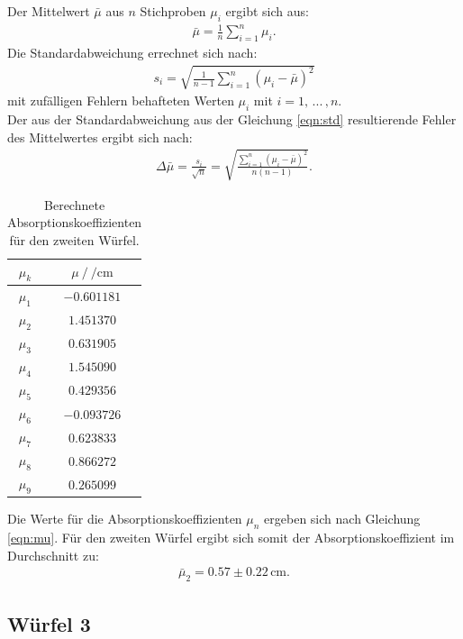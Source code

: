 Der Mittelwert $\bar{\mu}$ aus $n$ Stichproben $\mu_i$ ergibt sich aus: 
\begin{align}
  \bar{\mu} = \frac{1}{n} \sum_{i=1}^n \mu_i.
\end{align}
Die Standardabweichung errechnet sich nach: 
\begin{align}
  \label{eqn:std}
  s_i = \sqrt{\frac{1}{n-1} \sum_{i=1}^n (\mu_i - \bar{\mu})^2}
\end{align}
mit zufälligen Fehlern behafteten Werten $\mu_i$ mit $i =1, \,...\,,n$.\\
Der aus der Standardabweichung aus der Gleichung \ref{eqn:std} resultierende Fehler des Mittelwertes ergibt sich nach: 
\begin{align}
  \Delta \bar{\mu} = \frac{s_i}{\sqrt{n}} = \sqrt{\frac{\sum_{i=1}^n (\mu_i - \bar{\mu})^2}{n(n-1)}}.
\end{align}
\begin{table}[H]
  \centering
  \begin{tabular}{c c}
    \toprule
     $\mu_k$ &  $\mu \:/\: \si{\per\centi\metre}$ \\
    \midrule
            $\mu_{  1}$ &   $-0.601181$ \\
            $\mu_{  2}$ &   $ 1.451370$ \\
            $\mu_{  3}$ &   $ 0.631905$ \\
            $\mu_{  4}$ &   $ 1.545090$ \\
            $\mu_{  5}$ &   $ 0.429356$ \\
            $\mu_{  6}$ &   $-0.093726$ \\
             $\mu_{ 7}$ &   $ 0.623833$ \\
             $\mu_{ 8}$ &   $ 0.866272$ \\
             $\mu_{ 9}$ &   $ 0.265099$ \\
    \bottomrule
    \end{tabular}
  \caption{Berechnete Absorptionskoeffizienten für den zweiten Würfel. }
  \label{tab:w2_mu}
\end{table}

Die Werte für die Absorptionskoeffizienten $\mu_n$ ergeben sich nach Gleichung \ref{eqn:mu}. Für den zweiten Würfel ergibt sich somit der Absorptionskoeffizient im Durchschnitt zu:
\begin{align}
  \bar{\mu}_2 = 0.57\pm 0.22 \,\si{\centi\metre}.
\end{align}
\subsection{Würfel 3}

